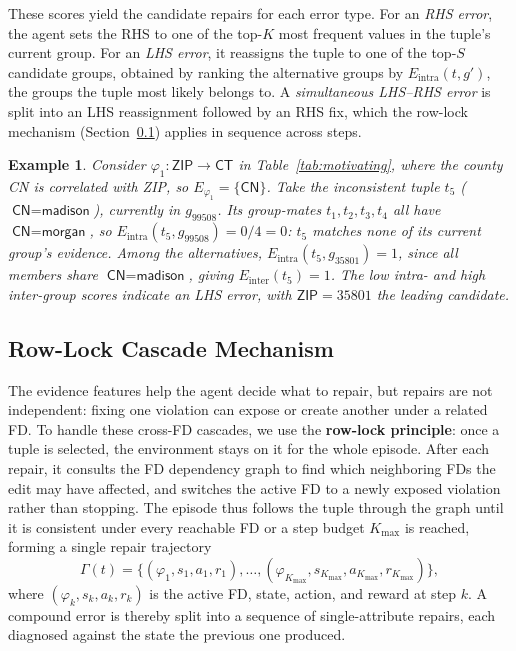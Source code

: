 \documentclass[sigconf]{acmart}
\newtheorem{example}{Example}
\begin{document}
These scores yield the candidate repairs for each error type. For an \emph{RHS error}, the agent sets the RHS to one of the top-$K$ most frequent values in the tuple's current group. For an \emph{LHS error}, it reassigns the tuple to one of the top-$S$ candidate groups, obtained by ranking the alternative groups by $E_{\text{intra}}(t, g')$, the groups the tuple most likely belongs to. A \emph{simultaneous LHS--RHS error} is split into an LHS reassignment followed by an RHS fix, which the row-lock mechanism (Section~\ref{sec:rowlock}) applies in sequence across steps.

\begin{example}
Consider $\varphi_1: \textsf{ZIP} \rightarrow \textsf{CT}$ in Table~\ref{tab:motivating}, where the county \textsf{CN} is correlated with \textsf{ZIP}, so $E_{\varphi_1} = \{\textsf{CN}\}$. Take the inconsistent tuple $t_5$ ($\textsf{CN}=\textsf{madison}$), currently in $g_{99508}$. Its group-mates $t_1, t_2, t_3, t_4$ all have $\textsf{CN}=\textsf{morgan}$, so $E_{\text{intra}}(t_5, g_{99508}) = 0/4 = 0$: $t_5$ matches none of its current group's evidence. Among the alternatives, $E_{\text{intra}}(t_5, g_{35801}) = 1$, since all members share $\textsf{CN}=\textsf{madison}$, giving $E_{\text{inter}}(t_5) = 1$. The low intra- and high inter-group scores indicate an LHS error, with $\textsf{ZIP}=35801$ the leading candidate.
\end{example}


\subsection{Row-Lock Cascade Mechanism}
\label{sec:rowlock}

The evidence features help the agent decide what to repair, but repairs are not independent: fixing one violation can expose or create another under a related FD. To handle these cross-FD cascades, we use the \textbf{row-lock principle}: once a tuple is selected, the environment stays on it for the whole episode. After each repair, it consults the FD dependency graph to find which neighboring FDs the edit may have affected, and switches the active FD to a newly exposed violation rather than stopping. The episode thus follows the tuple through the graph until it is consistent under every reachable FD or a step budget $K_{\max}$ is reached, forming a single repair trajectory
\[
\Gamma(t)=
\{(\varphi_1,s_1,a_1,r_1),\ldots,(\varphi_{K_{\max}},s_{K_{\max}},a_{K_{\max}},r_{K_{\max}})\},
\]
where $(\varphi_k,s_k,a_k,r_k)$ is the active FD, state, action, and reward at step $k$. A compound error is thereby split into a sequence of single-attribute repairs, each diagnosed against the state the previous one produced.
\end{document}
